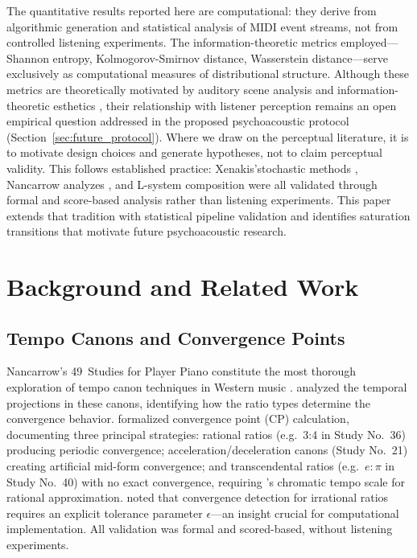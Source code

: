 \documentclass[a4paper]{article}
\theoremstyle{definition}
\theoremstyle{remark}
\begin{document}
The quantitative results reported here are computational: they derive from algorithmic generation and statistical analysis of MIDI event streams, not from controlled listening experiments. The information-theoretic metrics employed---Shannon entropy, Kolmogorov-Smirnov distance, Wasserstein distance---serve exclusively as computational measures of distributional structure. Although these metrics are theoretically motivated by auditory scene analysis \citep{bregman1994auditory} and information-theoretic esthetics \citep{leonard1956emotion, birkhoff2013aesthetic}, their relationship with listener perception remains an open empirical question addressed in the proposed psychoacoustic protocol (Section~\ref{sec:future_protocol}). Where we draw on the perceptual literature, it is to motivate design choices and generate hypotheses, not to claim perceptual validity. This follows established practice: Xenakis'stochastic methods \citep{xenakis1992formalized}, Nancarrow analyzes \citep{gann1995music, nemire2014convergence}, and L-system composition \citep{manousakis2006musical} were all validated through formal and score-based analysis rather than listening experiments. This paper extends that tradition with statistical pipeline validation and identifies saturation transitions that motivate future psychoacoustic research.

\section{Background and Related Work}
\label{sec:background}

\subsection{Tempo Canons and Convergence Points}

Nancarrow's 49~Studies for Player Piano constitute the most thorough exploration of tempo canon techniques in Western music \citep{gann1995music}. \citet{thomas2000nancarrow} analyzed the temporal projections in these canons, identifying how the ratio types determine the convergence behavior. \citet{nemire2014convergence} formalized convergence point (CP) calculation, documenting three principal strategies: rational ratios (e.g.\ 3:4 in Study No.~36) producing periodic convergence; acceleration/deceleration canons (Study No.~21) creating artificial mid-form convergence; and transcendental ratios (e.g.\ $e:\pi$ in Study No.~40) with no exact convergence, requiring \citet{cowell1996new}'s chromatic tempo scale for rational approximation. \citet{callender2014performing} noted that convergence detection for irrational ratios requires an explicit tolerance parameter $\epsilon$---an insight crucial for computational implementation. All validation was formal and scored-based, without listening experiments.
\end{document}
